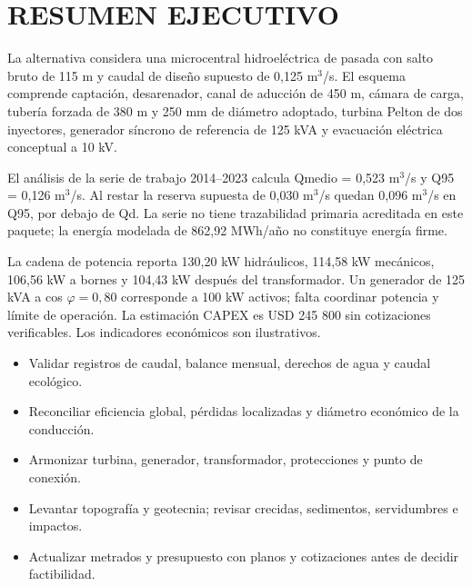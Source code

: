 \documentclass[11pt,a4paper]{article}
\begin{document}
\section*{RESUMEN EJECUTIVO}
La alternativa considera una microcentral hidroeléctrica de pasada con salto bruto de 115 m y caudal de diseño supuesto de 0,125 m$^3$/s. El esquema comprende captación, desarenador, canal de aducción de 450 m, cámara de carga, tubería forzada de 380 m y 250 mm de diámetro adoptado, turbina Pelton de dos inyectores, generador síncrono de referencia de 125 kVA y evacuación eléctrica conceptual a 10 kV.

El análisis de la serie de trabajo 2014--2023 calcula Qmedio = 0,523 m$^3$/s y Q95 = 0,126 m$^3$/s. Al restar la reserva supuesta de 0,030 m$^3$/s quedan 0,096 m$^3$/s en Q95, por debajo de Qd. La serie no tiene trazabilidad primaria acreditada en este paquete; la energía modelada de 862,92 MWh/año no constituye energía firme.

La cadena de potencia reporta 130,20 kW hidráulicos, 114,58 kW mecánicos, 106,56 kW a bornes y 104,43 kW después del transformador. Un generador de 125 kVA a cos $\varphi=0,80$ corresponde a 100 kW activos; falta coordinar potencia y límite de operación. La estimación CAPEX es USD 245 800 sin cotizaciones verificables. Los indicadores económicos son ilustrativos.

\begin{resumenbox}[title=Hallazgos que gobiernan la siguiente decisión]
\begin{itemize}
\item Validar registros de caudal, balance mensual, derechos de agua y caudal ecológico.
\item Reconciliar eficiencia global, pérdidas localizadas y diámetro económico de la conducción.
\item Armonizar turbina, generador, transformador, protecciones y punto de conexión.
\item Levantar topografía y geotecnia; revisar crecidas, sedimentos, servidumbres e impactos.
\item Actualizar metrados y presupuesto con planos y cotizaciones antes de decidir factibilidad.
\end{itemize}
\end{resumenbox}
\end{document}
